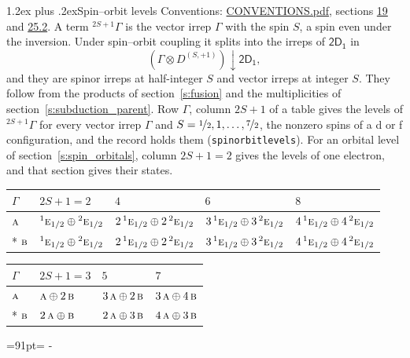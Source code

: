 \documentclass[10pt,a4paper]{article}
\makeatletter
\renewcommand\section{\@startsection{section}{1}{\z@}{-3ex plus -1ex minus -.2ex}%
  {1.2ex plus .2ex}{\normalfont\large\sffamily\bfseries\color{parttitle}}}
\newcommand{\needspace}[1]{\par\penalty-100\begingroup\dimen0=#1\relax\dimen2=\pagegoal
  \advance\dimen2-\pagetotal\ifdim\dimen0>\dimen2\relax\ifdim\dimen2>0pt\vfil\break\fi\fi
  \endgroup}
\numberwithin{equation}{section}
\newcommand{\grp}[1]{\mathsf{#1}}
\newcommand{\irr}[1]{\text{\normalfont\scshape #1}}
\newcommand{\conjpair}[1]{{}^{#1}}
\newcommand{\restr}[2]{#1\!\downarrow#2}
\newcommand{\irrJp}[2]{D^{(#1,#2)}}
\newcommand{\irrprod}{\otimes}
\newcommand{\term}[2]{{}^{#1}#2}
\makeatother
\begin{document}
\section{Spin--orbit levels}\label{s:spin_orbit}
Conventions: \href{../../CONVENTIONS.pdf}{CONVENTIONS.pdf}, sections \href{../../../rotation/CONVENTIONS.pdf\#conv.19}{19} and \href{../../CONVENTIONS.pdf\#conv.25.2}{25.2}.
\leavevmode\label{n:local.spin}\label{n:symbol.term}A term $\term{2S+1}{\Gamma}$ is the vector irrep $\Gamma$ with the spin $S$, a spin even under the inversion. Under spin--orbit coupling it splits into the irreps of $\grp{2D_{1}}$ in
\begin{equation}\label{e:spinorbit}\restr{(\Gamma \irrprod \irrJp{S}{+1})}{\grp{2D_{1}}},\end{equation}
and they are spinor irreps at half-integer $S$ and vector irreps at integer $S$. They follow from the products of section~\ref{s:fusion} and the multiplicities of section~\ref{s:subduction_parent}. Row $\Gamma$, column $2S + 1$ of a table gives the levels of $\term{2S+1}{\Gamma}$ for every vector irrep $\Gamma$ and $S = \nicefrac{1}{2}, 1, \dots, \nicefrac{7}{2}$, the nonzero spins of a d or f configuration, and the record holds them (\texttt{spinorbitlevels}). For an orbital level of section~\ref{s:spin_orbitals}, column $2S + 1 = 2$ gives the levels of one electron, and that section gives their states.
{\small\setlength{\tabcolsep}{3pt}\begin{longtable}{@{}lllll@{}}\toprule
$\Gamma$ & $2S + 1 = 2$ & $4$ & $6$ & $8$\\\midrule\endhead
\bottomrule\endfoot\endlastfoot
$\irr{a}$ & $\conjpair{1}\irr{e}_{1/2}\oplus \conjpair{2}\irr{e}_{1/2}$ & $2\,\conjpair{1}\irr{e}_{1/2}\oplus 2\,\conjpair{2}\irr{e}_{1/2}$ & $3\,\conjpair{1}\irr{e}_{1/2}\oplus 3\,\conjpair{2}\irr{e}_{1/2}$ & $4\,\conjpair{1}\irr{e}_{1/2}\oplus 4\,\conjpair{2}\irr{e}_{1/2}$\\*
$\irr{b}$ & $\conjpair{1}\irr{e}_{1/2}\oplus \conjpair{2}\irr{e}_{1/2}$ & $2\,\conjpair{1}\irr{e}_{1/2}\oplus 2\,\conjpair{2}\irr{e}_{1/2}$ & $3\,\conjpair{1}\irr{e}_{1/2}\oplus 3\,\conjpair{2}\irr{e}_{1/2}$ & $4\,\conjpair{1}\irr{e}_{1/2}\oplus 4\,\conjpair{2}\irr{e}_{1/2}$\\
\bottomrule\end{longtable}}
{\small\setlength{\tabcolsep}{3pt}\begin{longtable}{@{}llll@{}}\toprule
$\Gamma$ & $2S + 1 = 3$ & $5$ & $7$\\\midrule\endhead
\bottomrule\endfoot\endlastfoot
$\irr{a}$ & $\irr{a}\oplus 2\,\irr{b}$ & $3\,\irr{a}\oplus 2\,\irr{b}$ & $3\,\irr{a}\oplus 4\,\irr{b}$\\*
$\irr{b}$ & $2\,\irr{a}\oplus \irr{b}$ & $2\,\irr{a}\oplus 3\,\irr{b}$ & $4\,\irr{a}\oplus 3\,\irr{b}$\\
\bottomrule\end{longtable}}
\needspace{91pt}
\end{document}
